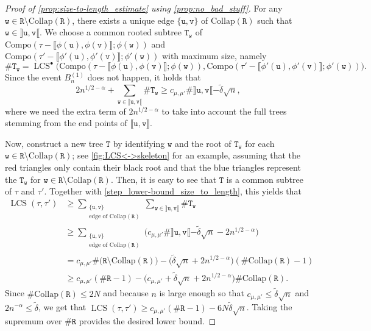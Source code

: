 \documentclass[11pt,reqno]{amsart}
\newcommand{\1}{\mathbf{1}}
\newcommand{\0}{\mathbf{0}}
\newcommand{\ttT}{\mathtt{T}}
\newcommand{\ttR}{\mathtt{R}}
\newcommand{\ttu}{\mathtt{u}}
\newcommand{\ttv}{\mathtt{v}}
\newcommand{\ttw}{\mathtt{w}}
\newcommand{\LCS}{\operatorname{LCS}}
\begin{document}
\begin{proof}[Proof of \cref{prop:size-to-length_estimate} using \cref{prop:no_bad_stuff}]
For any $\ttw\in\ttR\setminus\mathrm{Collap}(\ttR)$, there exists a unique edge $\{\ttu,\ttv\}$ of $\mathrm{Collap}(\ttR)$ such that $\ttw\in\rrbracket \ttu,\ttv\llbracket$. We choose a common rooted subtree $\ttT_\ttw$ of $\mathrm{Compo}(\tau-\llbracket \phi(\ttu),\phi(\ttv)\rrbracket;\phi(\ttw))$ and $\mathrm{Compo}(\tau'-\llbracket \phi'(\ttu),\phi'(\ttv)\rrbracket;\phi'(\ttw))$ with maximum size, namely
\[\#\ttT_\ttw=\LCS^\bullet\Big(\mathrm{Compo}(\tau-\llbracket \phi(\ttu),\phi(\ttv)\rrbracket;\phi(\ttw)),\mathrm{Compo}(\tau'-\llbracket \phi'(\ttu),\phi'(\ttv)\rrbracket;\phi'(\ttw))\Big).\]
Since the event $B_n^{(1)}$ does not happen, it holds that
\begin{equation}
\label{step_lower-bound_size_to_length}
2n^{1/2-\alpha}+\sum_{\ttw\in\rrbracket \ttu,\ttv\llbracket}\#\ttT_\ttw\geq c_{\mu,\mu'}\#\rrbracket \ttu,\ttv\llbracket -\tilde{\delta}\sqrt{n},
\end{equation}
where we need the extra term of $2n^{1/2-\alpha}$ to take into account the full trees stemming from  the end points of  $\llbracket \ttu,\ttv\rrbracket$.
\smallskip

Now, construct a new tree $\ttT$ by identifying $\ttw$ and the root of $\ttT_\ttw$ for each $\ttw\in\ttR\setminus\mathrm{Collap}(\ttR)$; see \cref{fig:LCS<->skeleton} for an example, assuming that the red triangles only contain their black root and that the blue triangles represent the $\ttT_\ttw$ for $\ttw\in\ttR\setminus\mathrm{Collap}(\ttR)$. Then, it is easy to see that $\ttT$ is a common subtree of $\tau$ and $\tau'$. 
Together with \eqref{step_lower-bound_size_to_length}, this yields that
\begin{align*}
\LCS(\tau,\tau')&\geq \sum_{\substack{\{\ttu,\ttv\}\\ \text{edge of }\mathrm{Collap}(\ttR)}}\sum_{\ttw\in\rrbracket\ttu,\ttv\llbracket}\#\ttT_\ttw\\
&\geq \sum_{\substack{\{\ttu,\ttv\}\\ \text{edge of }\mathrm{Collap}(\ttR)}}\big(c_{\mu,\mu'}\#\rrbracket \ttu,\ttv\llbracket -\tilde{\delta}\sqrt{n}-2n^{1/2-\alpha}\big)\\
&=c_{\mu,\mu'}\#\big(\ttR\setminus \mathrm{Collap}(\ttR)\big) -\big(\tilde{\delta}\sqrt{n}+2n^{1/2-\alpha}\big)(\#\mathrm{Collap}(\ttR)-1)\\
&\geq c_{\mu,\mu'}(\#\ttR -1) -\big(c_{\mu,\mu'}+\tilde{\delta}\sqrt{n}+2n^{1/2-\alpha}\big)\#\mathrm{Collap}(\ttR).
\end{align*}
Since $\#\mathrm{Collap}(\ttR)\leq 2N$ and because $n$ is large enough so that $c_{\mu,\mu'}\leq \tilde{\delta}\sqrt{n}$ and $2n^{-\alpha}\leq \tilde{\delta}$, we get that $\LCS(\tau,\tau')\geq c_{\mu,\mu'}(\#\ttR-1)-6N\tilde{\delta}\sqrt{n}$. Taking the supremum over $\#\ttR$ provides the desired lower bound.


\end{proof}
\end{document}
